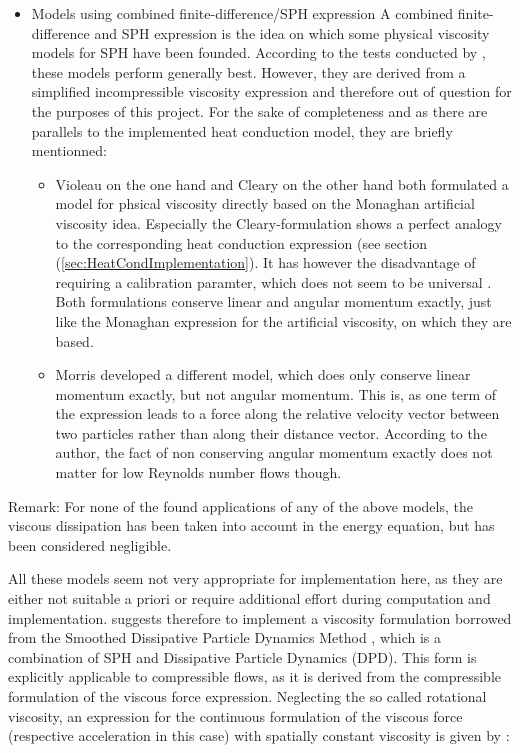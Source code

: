 \documentclass{report}
\begin{document}
\begin{itemize}
\item Models using combined finite-difference/SPH expression
A combined finite-difference and SPH expression is the idea on which some physical viscosity models for SPH have been founded. According to the tests conducted by \cite{Basa2009}, these models perform generally best. However, they are derived from a simplified incompressible viscosity expression and therefore out of question for the purposes of this project. For the sake of completeness and as there are parallels to the implemented heat conduction model, they are briefly mentionned:
\begin{itemize}
 \item Violeau on the one hand and Cleary on the other hand both formulated a model for phsical viscosity directly based on the Monaghan artificial viscosity idea. Especially the Cleary-formulation shows a perfect analogy to the corresponding heat conduction expression (see section (\ref{sec:HeatCondImplementation}).
 It has however the disadvantage of requiring a calibration paramter, which does not seem to be universal \cite{Basa2009}.
Both formulations conserve linear and angular momentum exactly, just like the Monaghan expression for the artificial viscosity, on which they are based.	
\item Morris \cite{Morris1997} developed a different model, which does only conserve linear momentum exactly, but not angular momentum. This is, as one term of the expression leads to a force along the relative velocity vector between two particles rather than along their distance vector. According to the author, the fact of non conserving angular momentum exactly does not matter for low Reynolds number flows though. 

\end{itemize}
\end{itemize}

Remark: For none of the found applications of any of the above models, the viscous dissipation has been taken into account in the energy equation, but has been considered negligible.

All these models seem not very appropriate for implementation here, as they are either not suitable a priori or require additional effort during computation and implementation.
\cite{LitvinovPersCom} suggests therefore to implement a viscosity formulation borrowed from the Smoothed Dissipative Particle Dynamics Method \cite{Espanol2003}, which is a combination of SPH and Dissipative Particle Dynamics (DPD). This form is explicitly applicable to compressible flows, as it is derived from the compressible formulation of the viscous force expression.
Neglecting the so called rotational viscosity, an expression for the continuous formulation of the viscous force (respective acceleration in this case) with spatially constant viscosity is given by  \cite{deGroot1962}:
\end{document}
